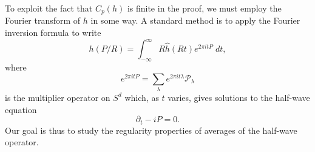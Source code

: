 

To exploit the fact that $C_p(h)$ is finite in the proof, we must employ the Fourier transform of $h$ in some way. A standard method is to apply the Fourier inversion formula to write
%
\[ h(P/R) = \int_{-\infty}^\infty R \widehat{h}(Rt) e^{2 \pi i t P}\; dt, \]
%
where
%
\[ e^{2 \pi i t P} = \sum_\lambda e^{2 \pi i t \lambda} \mathcal{P}_\lambda \]
%
is the multiplier operator on $S^d$ which, as $t$ varies, gives solutions to the half-wave equation
%
\[ \partial_t - i P = 0. \]
%
%
%
%
%
%
%
%
%
%
%
%
%
%
Our goal is thus to study the regularity properties of averages of the half-wave operator.

